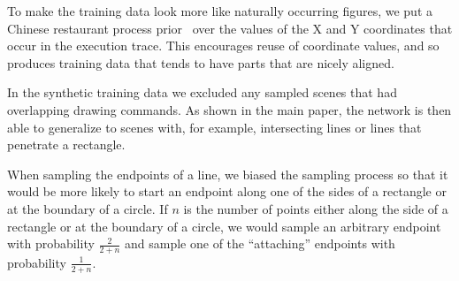 \documentclass{article}
\begin{document}
To make the training data look more like naturally occurring figures,
we put a Chinese restaurant process prior~\cite{gershman2012tutorial} over
the values of the X and Y coordinates that occur in the execution trace.
This encourages reuse of coordinate values,
and so produces training data that tends to have parts that are nicely aligned.

In the synthetic training data we excluded any sampled scenes that had
overlapping drawing commands.  As shown in the main paper, the network
is then able to generalize to scenes with, for example, intersecting
lines or lines that penetrate a rectangle.

When sampling the endpoints of a line,
we biased the sampling process so that it would
be more likely to start an endpoint
along one of the sides of a rectangle or at the boundary of a circle.
If $n$ is the number of points either along the side of a rectangle or at the boundary of a circle,
we would sample an arbitrary endpoint with probability $\frac{2}{2 + n}$
and sample one of the ``attaching'' endpoints with probability $\frac{1}{2 + n}$.
\end{document}
